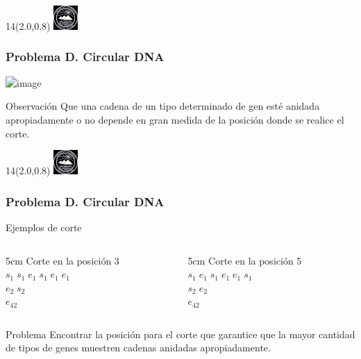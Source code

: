 \documentclass[10pt,xcolor=tables,{dvipsnames}]{beamer}
\newcommand{\MyLogo}{%
	\begin{textblock}{14}(2.0,0.8)
		\includegraphics[height=0.925cm, angle=0]{UOWhite}
	\end{textblock}
}
\begin{document}
     
   	\begin{frame}
   		\MyLogo
   		\frametitle{Problema D. Circular DNA}
	   	\begin{center}
	     	\includegraphics<1->[scale=0.38]{DNA}
	   	\end{center}

   		\begin{block}{Observación}
             Que una cadena de un tipo determinado de gen esté anidada apropiadamente o no depende en gran medida de la posición donde se realice el corte.
   		\end{block}	
   	\end{frame}
   	
   	   	\begin{frame}
   	   		\MyLogo
   	   		\frametitle{Problema D. Circular DNA}
   	   		\begin{block}{Ejemplos de corte}
   	   			\begin{columns}
   	   				\begin{column}{5cm}
   	   					Corte en la posición 3\\[0.1cm]
   	   					$s_1 \; s_1 \; e_1 \; s_1 \; e_1 \; e_1$\\[0.05cm]
   	   					$e_2 \; s_2$\\[0.05cm]
   	   					$e_{42}$
   	   				\end{column}
   	   				\begin{column}{5cm}
   	   					Corte en la posición 5\\[0.1cm]
   	   					$s_1 \; e_1 \; s_1 \; e_1 \; e_1 \; s_1$\\[0.05cm]
   	   					$s_2 \; e_2$\\[0.05cm]
   	   					$e_{42}$
   	   				\end{column}
   	   				
   	   			\end{columns}
   	   		\end{block}
   	   	\begin{block}{Problema}
   	   		Encontrar la posición para el corte que garantice que la mayor cantidad de tipos de genes muestren cadenas anidadas apropiadamente.
   	   	\end{block}	
   	   	\end{frame}
   	   	
\end{document}
